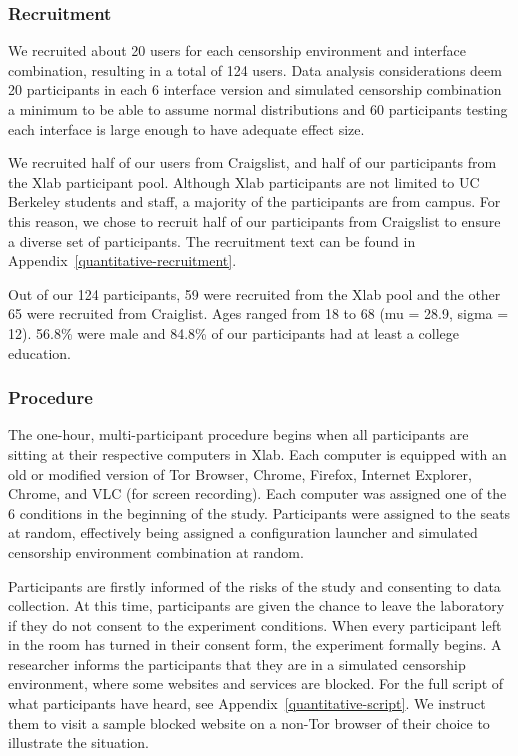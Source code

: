 \documentclass[USenglish,oneside,twocolumn]{article}
\begin{document}
\subsubsection{Recruitment}
We recruited about 20 users for each censorship environment
and interface combination, resulting in a total of 124 users. 
Data analysis considerations deem 20 participants in each 
6 interface version and simulated censorship combination a 
minimum to be able to assume normal distributions and 60 participants
testing each interface is large enough to have adequate effect size.

We recruited half of our users from Craigslist, and half of our participants from 
the Xlab participant pool. Although Xlab participants are not limited to UC Berkeley students and staff,
a majority of the participants are from campus. For this reason, we chose to recruit 
half of our participants from Craigslist to ensure a diverse set of participants. 
The recruitment text can be found in Appendix~\ref{quantitative-recruitment}. 

Out of our 124 participants, 59 were recruited from the Xlab pool and the other 65 were
recruited from Craiglist. Ages ranged from 18 to 68
(mu = 28.9, sigma = 12). 56.8\% were male and 
84.8\% of our participants had at least a college education.

\subsubsection{Procedure}
The one-hour, multi-participant procedure begins when all participants are sitting at their
respective computers in Xlab. Each computer is equipped with an old or modified version
of Tor Browser, Chrome, Firefox, Internet Explorer,  Chrome, and VLC (for screen recording).
Each computer was assigned one of the 6 conditions in the beginning of the study. Participants
were assigned to the seats at random, effectively being assigned a configuration launcher and
simulated censorship environment combination at random. 

Participants are firstly informed of the risks of the study and consenting to data collection.  At
this time, participants are given the chance to leave the laboratory if they do not consent to 
the experiment conditions. When every participant left in the room has turned in their consent
form, the experiment formally begins. A researcher informs the participants that they are in a
simulated censorship environment, where some websites and services are blocked. 
For the full script of what participants have heard, see Appendix~\ref{quantitative-script}. We
instruct them to visit a sample blocked website on a non-Tor browser of their choice to illustrate 
the situation.
\end{document}
